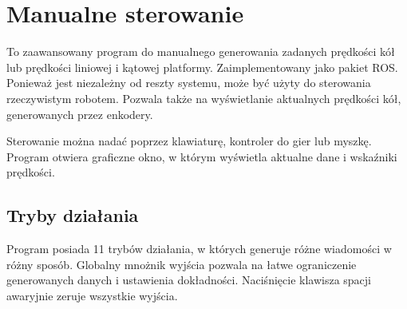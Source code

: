 \section{Manualne sterowanie}
\label{sec:lalkarz}
	To zaawansowany program do manualnego generowania zadanych prędkości kół lub prędkości liniowej i kątowej platformy.
	Zaimplementowany jako pakiet ROS.
	Ponieważ jest niezależny od reszty systemu, może być użyty do sterowania rzeczywistym robotem.
	Pozwala także na wyświetlanie aktualnych prędkości kół, generowanych przez enkodery.
	
	Sterowanie można nadać poprzez klawiaturę, kontroler do gier lub myszkę.
	Program otwiera graficzne okno, w którym wyświetla aktualne dane i wskaźniki prędkości.
	
	\subsection{Tryby działania}
		Program posiada 11 trybów działania, w których generuje różne wiadomości w różny sposób.
		Globalny mnożnik wyjścia pozwala na łatwe ograniczenie generowanych danych i ustawienia dokładności. Naciśnięcie klawisza spacji awaryjnie zeruje wszystkie wyjścia.
